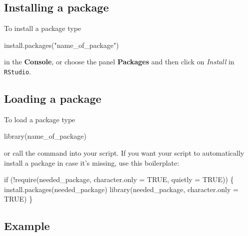 \documentclass[
  letterpaper,
  DIV=11,
  numbers=noendperiod]{scrreprt}
\newenvironment{Shaded}{\begin{snugshade}}{\end{snugshade}}
\newcommand{\AttributeTok}[1]{\textcolor[rgb]{0.40,0.45,0.13}{#1}}
\newcommand{\ConstantTok}[1]{\textcolor[rgb]{0.56,0.35,0.01}{#1}}
\newcommand{\ControlFlowTok}[1]{\textcolor[rgb]{0.00,0.23,0.31}{#1}}
\newcommand{\FunctionTok}[1]{\textcolor[rgb]{0.28,0.35,0.67}{#1}}
\newcommand{\NormalTok}[1]{\textcolor[rgb]{0.00,0.23,0.31}{#1}}
\newcommand{\SpecialCharTok}[1]{\textcolor[rgb]{0.37,0.37,0.37}{#1}}
\newcommand{\StringTok}[1]{\textcolor[rgb]{0.13,0.47,0.30}{#1}}
\begin{document}
\hypertarget{installing-a-package}{%
\subsection{Installing a package}\label{installing-a-package}}

To install a package type

\begin{Shaded}
\begin{Highlighting}[]
\FunctionTok{install.packages}\NormalTok{(}\StringTok{"name\_of\_package"}\NormalTok{)}
\end{Highlighting}
\end{Shaded}

in the \textbf{Console}, or choose the panel \textbf{Packages} and then
click on \emph{Install} in \texttt{RStudio}.

\hypertarget{loading-a-package}{%
\subsection{Loading a package}\label{loading-a-package}}

To load a package type

\begin{Shaded}
\begin{Highlighting}[]
\FunctionTok{library}\NormalTok{(name\_of\_package)}
\end{Highlighting}
\end{Shaded}

or call the command into your script. If you want your script to
automatically install a package in case it's missing, use this
boilerplate:

\begin{Shaded}
\begin{Highlighting}[]
\ControlFlowTok{if}\NormalTok{ (}\SpecialCharTok{!}\FunctionTok{require}\NormalTok{(needed\_package, }\AttributeTok{character.only =} \ConstantTok{TRUE}\NormalTok{, }\AttributeTok{quietly =} \ConstantTok{TRUE}\NormalTok{)) \{}
    \FunctionTok{install.packages}\NormalTok{(needed\_package)}
    \FunctionTok{library}\NormalTok{(needed\_package, }\AttributeTok{character.only =} \ConstantTok{TRUE}\NormalTok{)}
\NormalTok{\}}
\end{Highlighting}
\end{Shaded}

\hypertarget{example}{%
\subsection{Example}\label{example}}
\end{document}
